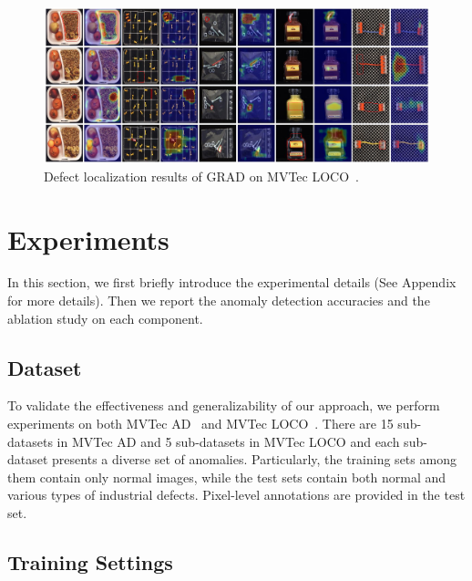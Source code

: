\documentclass[letterpaper]{article} %
\begin{document}
\begin{figure}[!htbp]
\setlength{\belowcaptionskip}{0.0cm}
\setlength{\abovecaptionskip}{0.1cm}
    \centering
\includegraphics[width=0.9\linewidth]{images/loco_results.pdf}
    \caption{Defect localization results of GRAD on MVTec LOCO~\cite{MVloco}. } %
    \label{fig: main_results}
\end{figure}

\section{Experiments}

In this section, we first briefly introduce the experimental details (See Appendix for more details). Then we report the anomaly detection accuracies and the ablation study on each component. %

\subsection{Dataset}

To validate the effectiveness and generalizability of our approach, we perform experiments on both MVTec AD~\cite{MVTecAD} and MVTec LOCO~\cite{MVloco}. There are 15 sub-datasets in MVTec AD and 5 sub-datasets in MVTec LOCO and each sub-dataset presents a diverse set of anomalies. 
Particularly, the training sets among them contain only normal images, while the test sets contain both normal and various types of industrial defects. Pixel-level annotations are provided in the test set.

\subsection{Training Settings}
\end{document}
